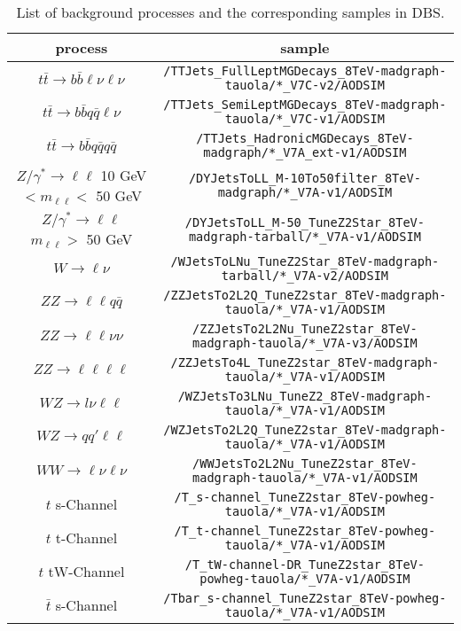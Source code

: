\begin{table}[htb] 
\scriptsize
\caption{List of background processes and the corresponding samples in DBS.}
\label{appTab:MCSamples}
\begin{tabular}{c|c}
 process & sample \\
\hline 
$t\bar{t} \rightarrow b\bar{b}\ell\nu \ell\nu$ & \verb+/TTJets_FullLeptMGDecays_8TeV-madgraph-tauola/*_V7C-v2/AODSIM+ \\
$t\bar{t} \rightarrow b\bar{b}q\bar{q}\ell\nu$ & \verb+/TTJets_SemiLeptMGDecays_8TeV-madgraph-tauola/*_V7C-v1/AODSIM+ \\
$t\bar{t} \rightarrow b\bar{b}q\bar{q}q\bar{q}$ & \verb+/TTJets_HadronicMGDecays_8TeV-madgraph/*_V7A_ext-v1/AODSIM+ \\
\hline 
$Z/\gamma^{*} \rightarrow \ell\ell$ 10 GeV $< m_{\ell\ell} <$ 50 GeV & \verb+/DYJetsToLL_M-10To50filter_8TeV-madgraph/*_V7A-v1/AODSIM+ \\
$Z/\gamma^{*} \rightarrow \ell\ell$ $m_{\ell\ell} >$ 50 GeV & \verb+/DYJetsToLL_M-50_TuneZ2Star_8TeV-madgraph-tarball/*_V7A-v1/AODSIM+ \\
\hline 
$W \rightarrow \ell\nu$ & \verb+/WJetsToLNu_TuneZ2Star_8TeV-madgraph-tarball/*_V7A-v2/AODSIM+ \\
\hline 
$ZZ \rightarrow \ell\ell q\bar{q}$ & \verb+/ZZJetsTo2L2Q_TuneZ2star_8TeV-madgraph-tauola/*_V7A-v1/AODSIM+ \\
$ZZ \rightarrow \ell\ell\nu\nu$ & \verb+/ZZJetsTo2L2Nu_TuneZ2star_8TeV-madgraph-tauola/*_V7A-v3/AODSIM+ \\
$ZZ \rightarrow \ell\ell\ell\ell$ & \verb+/ZZJetsTo4L_TuneZ2star_8TeV-madgraph-tauola/*_V7A-v1/AODSIM+ \\
$WZ \rightarrow l\nu \ell\ell$ & \verb+/WZJetsTo3LNu_TuneZ2_8TeV-madgraph-tauola/*_V7A-v1/AODSIM+ \\
$WZ \rightarrow qq'\ell\ell$ & \verb+/WZJetsTo2L2Q_TuneZ2star_8TeV-madgraph-tauola/*_V7A-v1/AODSIM+ \\
$WW \rightarrow \ell\nu \ell\nu$ & \verb+/WWJetsTo2L2Nu_TuneZ2star_8TeV-madgraph-tauola/*_V7A-v1/AODSIM+ \\
\hline 
$t$ s-Channel & \verb+/T_s-channel_TuneZ2star_8TeV-powheg-tauola/*_V7A-v1/AODSIM+ \\
$t$ t-Channel & \verb+/T_t-channel_TuneZ2star_8TeV-powheg-tauola/*_V7A-v1/AODSIM+ \\
$t$ tW-Channel & \verb+/T_tW-channel-DR_TuneZ2star_8TeV-powheg-tauola/*_V7A-v1/AODSIM+ \\
$\bar{t}$ s-Channel & \verb+/Tbar_s-channel_TuneZ2star_8TeV-powheg-tauola/*_V7A-v1/AODSIM+ \\

\end{tabular}
\end{table}
